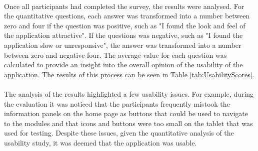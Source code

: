 {	\paragraph{}{
	Once all participants had completed the survey, the results were analysed. For the quantitative questions, each answer was transformed into a number between zero and four if the question was positive, such as "I found the look and feel of the application attractive". If the questions was negative, such as "I found the application slow or unresponsive", the answer was transformed into a number between zero and negative four. The average value for each question was calculated to provide an insight into the overall opinion of the usability of the application. The results of this process can be seen in Table \ref{tab:UsabilityScores}.
	}
	
	\paragraph{}{
	The analysis of the results highlighted a few usability issues. For example, during the evaluation it was noticed that the participants frequently mistook the information panels on the home page as buttons that could be used to navigate to the modules and that icons and buttons were too small on the tablet that was used for testing. Despite these issues, given the quantitative analysis of the usability study, it was deemed that the application was usable.
	}
	
}
